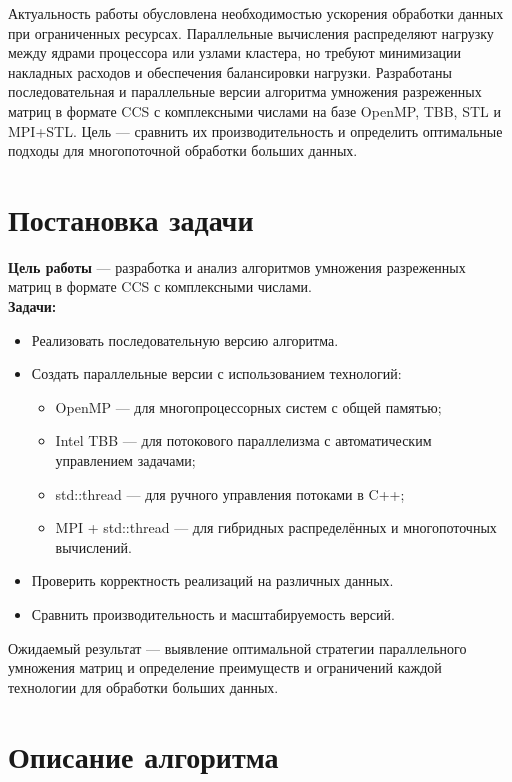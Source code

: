 \documentclass[12pt]{extarticle}
\begin{document}
Актуальность работы обусловлена необходимостью ускорения обработки данных при ограниченных ресурсах. Параллельные вычисления распределяют нагрузку между ядрами процессора или узлами кластера, но требуют минимизации накладных расходов и обеспечения балансировки нагрузки. Разработаны последовательная и параллельные версии алгоритма умножения разреженных матриц в формате CCS с комплексными числами на базе OpenMP, TBB, STL и MPI+STL. Цель — сравнить их производительность и определить оптимальные подходы для многопоточной обработки больших данных.

\section{Постановка задачи}

\hspace*{1.25cm}\textbf{Цель работы} — разработка и анализ алгоритмов умножения разреженных матриц в формате CCS с комплексными числами. \\[0.5cm]
\hspace*{1.25cm}\textbf{Задачи:}
\begin{itemize}
    \item Реализовать последовательную версию алгоритма.
    \item Создать параллельные версии с использованием технологий:
    \begin{itemize}
        \item OpenMP — для многопроцессорных систем с общей памятью;
        \item Intel TBB — для потокового параллелизма с автоматическим управлением задачами;
        \item std::thread — для ручного управления потоками в C++;
        \item MPI + std::thread — для гибридных распределённых и многопоточных вычислений.
    \end{itemize}
    \item Проверить корректность реализаций на различных данных.
    \item Сравнить производительность и масштабируемость версий.
\end{itemize}

Ожидаемый результат — выявление оптимальной стратегии параллельного умножения матриц и определение преимуществ и ограничений каждой технологии для обработки больших данных.


\section{Описание алгоритма}
\end{document}
